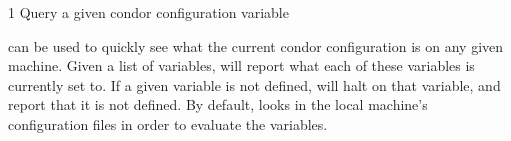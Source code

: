 \begin{ManPage}{\label{man-condor-config-val}}{1}
{Query a given condor configuration variable}
\Synopsis {}

\Description

 can be used to quickly see what the current
condor configuration is on any given machine.  Given a list of
variables,  will report what each of these
variables is currently set to.  If a given variable is not defined,
 will halt on that variable, and report that it is
not defined.  By default,  looks in the local
machine's configuration files in order to evaluate the variables.

\begin{Options}
\end{Options}

\end{ManPage}
